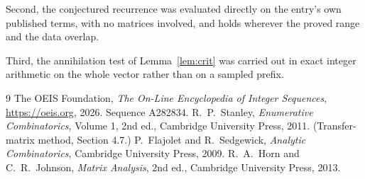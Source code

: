 \documentclass[11pt,a4paper]{article}
\theoremstyle{plain}
\theoremstyle{definition}
\begin{document}
Second, the conjectured recurrence was evaluated directly on the entry's own published terms,
with no matrices involved, and holds wherever the proved range and the data overlap.

Third, the annihilation test of Lemma~\ref{lem:crit} was carried out in exact integer
arithmetic on the whole vector rather than on a sampled prefix.

\begin{thebibliography}{9}
 The OEIS Foundation, \emph{The On-Line Encyclopedia of Integer
Sequences}, \url{https://oeis.org}, 2026. Sequence A282834.
 R.~P.~Stanley, \emph{Enumerative Combinatorics}, Volume 1, 2nd ed.,
Cambridge University Press, 2011. (Transfer-matrix method, Section 4.7.)
 P.~Flajolet and R.~Sedgewick, \emph{Analytic Combinatorics}, Cambridge
University Press, 2009.
 R.~A.~Horn and C.~R.~Johnson, \emph{Matrix Analysis}, 2nd ed., Cambridge
University Press, 2013.
\end{thebibliography}
\end{document}
